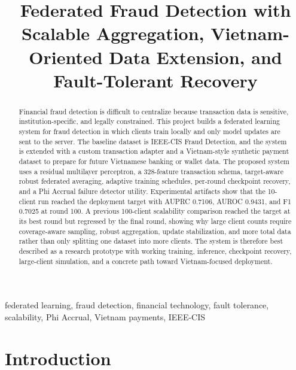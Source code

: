\documentclass[conference]{IEEEtran}
\begin{document}
\title{Federated Fraud Detection with Scalable Aggregation, Vietnam-Oriented Data Extension, and Fault-Tolerant Recovery}

\author{
}

\maketitle

\begin{abstract}
Financial fraud detection is difficult to centralize because transaction data is
sensitive, institution-specific, and legally constrained. This project builds a
federated learning system for fraud detection in which clients train locally and
only model updates are sent to the server. The baseline dataset is IEEE-CIS
Fraud Detection, and the system is extended with a custom transaction adapter
and a Vietnam-style synthetic payment dataset to prepare for future Vietnamese
banking or wallet data. The proposed system uses a residual multilayer
perceptron, a 328-feature transaction schema, target-aware robust federated
averaging, adaptive training schedules, per-round checkpoint recovery, and a Phi
Accrual failure detector utility. Experimental artifacts show that the 10-client
run reached the deployment target with AUPRC 0.7106, AUROC 0.9431, and F1
0.7025 at round 100. A previous 100-client scalability comparison reached the
target at its best round but regressed by the final round, showing why large
client counts require coverage-aware sampling, robust aggregation, update
stabilization, and more total data rather than only splitting one dataset into
more clients. The system is therefore best described as a research prototype
with working training, inference, checkpoint recovery, large-client simulation,
and a concrete path toward Vietnam-focused deployment.
\end{abstract}

\begin{IEEEkeywords}
federated learning, fraud detection, financial technology, fault tolerance,
scalability, Phi Accrual, Vietnam payments, IEEE-CIS
\end{IEEEkeywords}

\section{Introduction}
\end{document}
